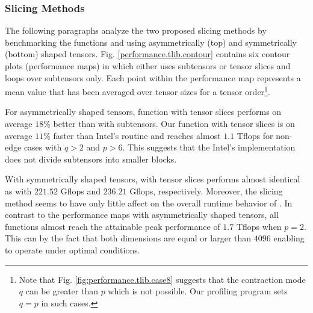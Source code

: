\subsubsection{Slicing Methods}
The following paragraphs analyze the two proposed slicing methods by benchmarking the functions  and  using asymmetrically (top) and symmetrically (bottom) shaped tensors.
Fig. \ref{performance.tlib.contour} contains six contour plots (performance maps) in which  either uses subtensors or tensor slices and  loops over subtensors only.
Each point within the performance map represents a mean value that has been averaged over tensor sizes for a tensor order\footnote{Note that Fig. \ref{fig:performance.tlib.case8} suggests that the contraction mode $q$ can be greater than $p$ which is not possible.
Our profiling program sets $q=p$ in such cases.}.

For asymmetrically shaped tensors, function  with tensor slices performs on average $18$\% better than with subtensors. %
Our function  with tensor slices is on average $11$\% faster than Intel's  routine and reaches almost $1.1$ Tflops for non-edge cases with $q>2$ and $p > 6$.
This suggests that the Intel's implementation does not divide subtensors into smaller blocks.

With symmetrically shaped tensors,  with tensor slices performs almost identical as  with $221.52$ Gflops and $236.21$ Gflops, respectively.
Moreover, the slicing method seems to have only little affect on the overall runtime behavior of .
In contrast to the performance maps with asymmetrically shaped tensors, all functions almost reach the attainable peak performance of $1.7$ Tflops when $p=2$.
This can by the fact that both dimensions are equal or larger than $4096$ enabling  to operate under optimal conditions.
\vspace{-1em}


